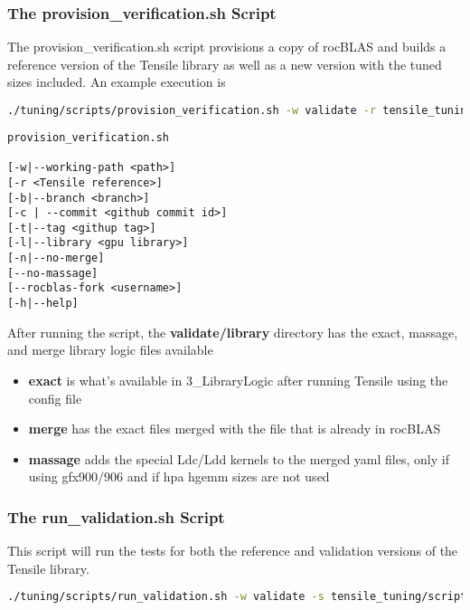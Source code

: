 \documentclass[]{article}
\begin{document}
\subsubsection{The provision\_verification.sh Script}

The provision\_verification.sh script provisions a copy of rocBLAS and builds a reference version of the Tensile library as well as a new version with the tuned sizes included. An example execution is

\begin{lstlisting}[language=bash,breaklines=true]
./tuning/scripts/provision_verification.sh -w validate -r tensile_tuning/tensile/Tensile -l vega20
\end{lstlisting}

\begin{verbatim}
provision_verification.sh 

[-w|--working-path <path>] 
[-r <Tensile reference>] 
[-b|--branch <branch>] 
[-c | --commit <github commit id>] 
[-t|--tag <githup tag>] 
[-l|--library <gpu library>] 
[-n|--no-merge] 
[--no-massage]  
[--rocblas-fork <username>] 
[-h|--help]
\end{verbatim}

After running the script, the \textbf{validate/library} directory has the exact, massage, and merge library logic files available
	
\begin{itemize}
	\item \textbf{exact} is what's available in 3\_LibraryLogic after running Tensile using the config file
	\item \textbf{merge} has the exact files merged with the file that is already in rocBLAS
	\item \textbf{massage} adds the special Ldc/Ldd kernels to the merged yaml files, only if using gfx900/906 and if hpa hgemm sizes are not used
\end{itemize}

\subsubsection{The run\_validation.sh Script}

This script will run the tests for both the reference and validation versions of the Tensile library.

\begin{lstlisting}[language=bash,breaklines=true]
./tuning/scripts/run_validation.sh -w validate -s tensile_tuning/scripts
\end{lstlisting}
\end{document}
